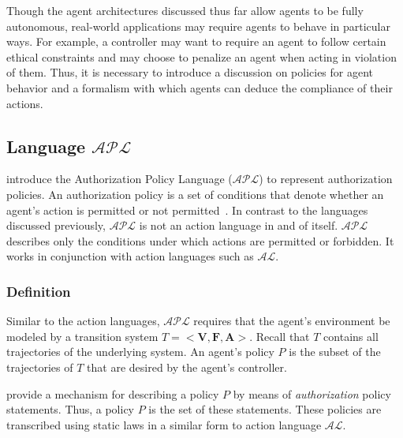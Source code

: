 Though the agent architectures discussed thus far allow agents to be fully autonomous, real-world applications may require agents to behave in particular ways.
For example, a controller may want to require an agent to follow certain ethical constraints and may choose to penalize an agent when acting in violation of them.
Thus, it is necessary to introduce a discussion on policies for agent behavior and a formalism with which agents can deduce the compliance of their actions.

\subsection{Language $\mathcal{APL}$}
\label{subsec:apl}

\citet{gelfond_authorization_2008} introduce the Authorization Policy Language ($\mathcal{APL}$) to represent authorization policies.
An authorization policy is a set of conditions that denote whether an agent's action is permitted or not permitted~\citep{gelfond_authorization_2008}.
In contrast to the languages discussed previously, $\mathcal{APL}$ is not an action language in and of itself.
$\mathcal{APL}$ describes only the conditions under which actions are permitted or forbidden.
It works in conjunction with action languages such as $\mathcal{AL}$.

\subsubsection{Definition}

Similar to the action languages, $\mathcal{APL}$ requires that the agent's environment be modeled by a transition system $T=<\boldsymbol{V},\boldsymbol{F},\boldsymbol{A}>$.
Recall that $T$ contains all trajectories of the underlying system.
An agent's policy $P$ is the subset of the trajectories of $T$ that are desired by the agent's controller.

\citet{gelfond_authorization_2008} provide a mechanism for describing a policy $P$ by means of \textit{authorization} policy statements.
Thus, a policy $P$ is the set of these statements.
These policies are transcribed using static laws in a similar form to action language $\mathcal{AL}$.

